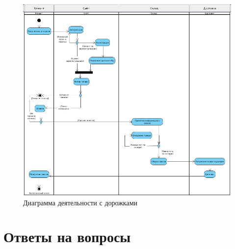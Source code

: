 \begin{figure}[h!tp]
	\centering
	\includegraphics[width=1\textwidth]{Screenshot from 2023-04-17 14-01-20}
	\caption{Диаграмма деятельности с дорожками}
	\label{fig:activity}
\end{figure}


\clearpage

\section*{Ответы на вопросы}

